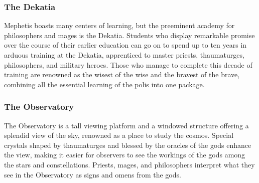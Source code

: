     \subsubsection{The Dekatia}
        Mephetis boasts many centers of learning, but the preeminent academy for philosophers and mages is the Dekatia.
        Students who display remarkable promise over the course of their earlier education can go on to spend up to ten years in arduous training at the Dekatia, apprenticed to master priests, thaumaturges, philosophers, and military heroes.
        Those who manage to complete this decade of training are renowned as the wisest of the wise and the bravest of the brave, combining all the essential learning of the polis into one package.

    \subsubsection{The Observatory}
        The Observatory is a tall viewing platform and a windowed structure offering a splendid view of the sky, renowned as a place to study the cosmos.
        Special crystals shaped by thaumaturges and blessed by the oracles of the gods enhance the view, making it easier for observers to see the workings of the gods among the stars and constellations.
        Priests, mages, and philosophers interpret what they see in the Observatory as signs and omens from the gods.

    \thispagestyle{empty} %

